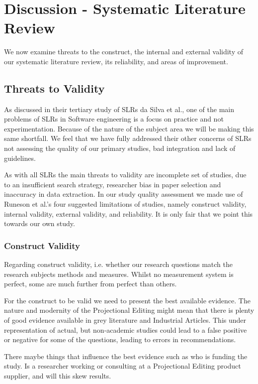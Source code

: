 \section{Discussion - Systematic Literature Review}
We now examine threats to the construct, the internal and external validity of our systematic literature review, its reliability, and areas of improvement.

 
\subsection{Threats to Validity}  
As discussed in their tertiary study of SLRs da Silva et al.\cite{DaSilvaFabioQ.B2011Syos}, one of the main problems of SLRs in Software engineering is a focus on practice and not experimentation.
Because of the nature of the subject area we will be making this same shortfall. 
We feel that we have fully addressed their other concerns of SLRs not assessing the quality of our primary studies, bad integration and lack of guidelines.

As with all SLRs the main threats to validity are incomplete set of studies, due to an insufficient search strategy, researcher bias in paper selection and inaccuracy in data extraction.
In our study quality assessment we made use of Runeson et al.'s\cite{runeson2009guidelines} four suggested limitations of studies, namely construct validity, internal validity, external validity, and reliability.
It is only fair that we point this towards our own study.

\subsubsection{Construct Validity}
Regarding construct validity, i.e. whether our research questions match the research subjects methods and measures.
Whilst no measurement system is perfect, some are much further from perfect than others.

For the construct to be valid we need to present the best available evidence.
The nature and modernity of the Projectional Editing might mean that there is plenty of good evidence available in grey literature and Industrial Articles. 
This under representation of actual, but non-academic studies could lead to a false positive or negative for some of the questions, leading to errors in recommendations.

There maybe things that influence the best evidence such as who is funding the study. 
Is a researcher working or consulting at a Projectional Editing product supplier, and will this skew results.

